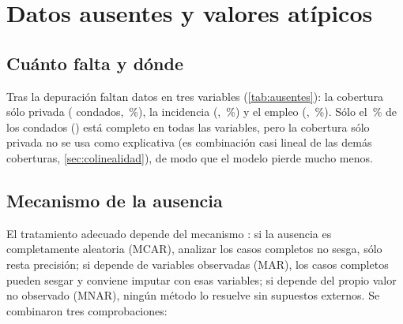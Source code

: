 \chapter{Datos ausentes y valores atípicos}\label{cap:ausentes}

\section{Cuánto falta y dónde}

Tras la depuración faltan datos en tres variables (\cref{tab:ausentes}): la cobertura sólo
privada ( condados, \,\%), la incidencia
(, \,\%) y el empleo
(, \,\%). Sólo el \,\% de
los condados () está completo en todas las variables, pero la cobertura
sólo privada no se usa como explicativa (es combinación casi lineal de las demás coberturas,
\cref{sec:colinealidad}), de modo que el modelo pierde mucho menos.



\section{Mecanismo de la ausencia}

El tratamiento adecuado depende del mecanismo \parencite{rubin1987}: si la ausencia es
completamente aleatoria (MCAR), analizar los casos completos no sesga, sólo resta precisión; si
depende de variables observadas (MAR), los casos completos pueden sesgar y conviene imputar con
esas variables; si depende del propio valor no observado (MNAR), ningún método lo resuelve sin
supuestos externos. Se combinaron tres comprobaciones:

